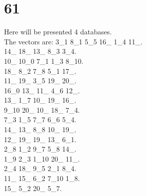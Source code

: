 \chapter{61}
\indent Here will be presented 4 databases.\\
The vectors are:
3\_1 8\_1 5\_5 16\_ 1\_4 11\_.\\14\_ 18\_ 13\_ 8\_3 3\_4.\\10\_ 10\_0 7\_1 1\_3 8\_10.\\18\_ 8\_2 7\_8 5\_1 17\_.\\11\_ 19\_ 3\_5 19\_ 20\_.\\16\_0 13\_ 11\_ 4\_6 12\_.\\13\_ 1\_7 10\_ 19\_ 16\_.\\9\_10 20\_ 10\_ 18\_ 7\_4.\\7\_3 1\_5 7\_7 6\_6 5\_4.\\14\_ 13\_ 8\_8 10\_ 19\_.\\12\_ 19\_ 19\_ 13\_ 6\_1.\\2\_8 1\_2 9\_7 5\_8 14\_.\\1\_9 2\_3 1\_10 20\_ 11\_.\\2\_4 18\_ 9\_5 2\_1 8\_4.\\11\_ 15\_ 6\_2 7\_10 1\_8.\\15\_ 5\_2 20\_ 5\_7.\\